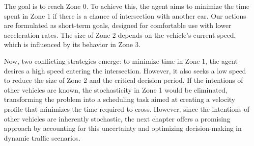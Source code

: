 The goal is to reach Zone 0. To achieve this, the agent aims to minimize the time spent in Zone 1 if there is a chance of intersection with another car. Our actions are formulated as short-term goals, designed for comfortable use with lower acceleration rates. The size of Zone 2 depends on the vehicle's current speed, which is influenced by its behavior in Zone 3.

Now, two conflicting strategies emerge: to minimize time in Zone 1, the agent desires a high speed entering the intersection. However, it also seeks a low speed to reduce the size of Zone 2 and the critical decision period. If the intentions of other vehicles are known, the stochasticity in Zone 1 would be eliminated, transforming the problem into a scheduling task aimed at creating a velocity profile that minimizes the time required to cross. However, since the intentions of other vehicles are inherently stochastic, the next chapter offers a promising approach by accounting for this uncertainty and optimizing decision-making in dynamic traffic scenarios.


